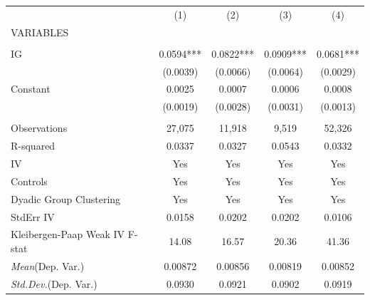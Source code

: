 \documentclass[]{article}
\begin{document}
\begin{tabular}{lcccc} \hline
 & (1) & (2) & (3) & (4) \\
VARIABLES &  &  &  &  \\ \hline
 &  &  &  &  \\
IG & 0.0594*** & 0.0822*** & 0.0909*** & 0.0681*** \\
 & (0.0039) & (0.0066) & (0.0064) & (0.0029) \\
Constant & 0.0025 & 0.0007 & 0.0006 & 0.0008 \\
 & (0.0019) & (0.0028) & (0.0031) & (0.0013) \\
 &  &  &  &  \\
Observations & 27,075 & 11,918 & 9,519 & 52,326 \\
R-squared & 0.0337 & 0.0327 & 0.0543 & 0.0332 \\
IV & Yes & Yes & Yes & Yes \\
Controls & Yes & Yes & Yes & Yes \\
Dyadic Group Clustering & Yes & Yes & Yes & Yes \\
StdErr IV & 0.0158 & 0.0202 & 0.0202 & 0.0106 \\
Kleibergen-Paap Weak IV F-stat & 14.08 & 16.57 & 20.36 & 41.36 \\
\textit{Mean}(Dep. Var.) & 0.00872 & 0.00856 & 0.00819 & 0.00852 \\
 \textit{Std.Dev.}(Dep. Var.) & 0.0930 & 0.0921 & 0.0902 & 0.0919 \\ \hline
\end{tabular}
\end{document}
